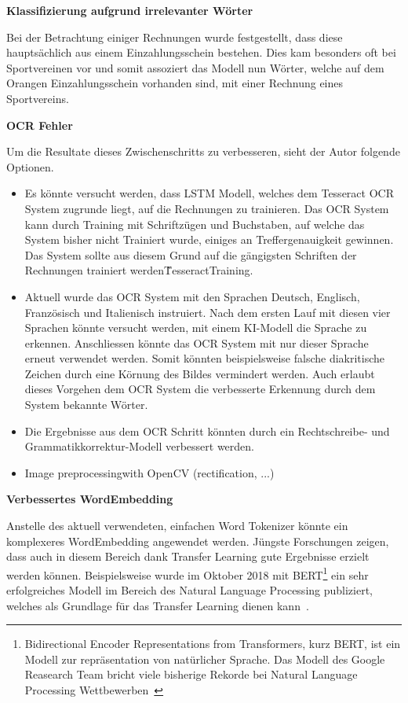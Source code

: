 \textbf{Klassifizierung aufgrund irrelevanter Wörter}

Bei der Betrachtung einiger Rechnungen wurde festgestellt, dass diese hauptsächlich aus einem Einzahlungsschein bestehen. Dies kam besonders oft bei Sportvereinen vor und somit assoziert das Modell nun Wörter, welche auf dem Orangen Einzahlungsschein vorhanden sind, mit einer Rechnung eines Sportvereins.

\hspace{10cm}


\hspace{10cm}

\textbf{OCR Fehler}

Um die Resultate dieses Zwischenschritts zu verbesseren, sieht der Autor folgende Optionen.

\begin{itemize}
    \item Es könnte versucht werden, dass LSTM Modell, welches dem Tesseract OCR System zugrunde liegt, auf die Rechnungen zu trainieren. Das OCR System kann durch Training mit Schriftzügen und Buchstaben, auf welche das System bisher nicht Trainiert wurde, einiges an Treffergenauigkeit gewinnen. Das System sollte aus diesem Grund auf die gängigsten Schriften der Rechnungen trainiert werden\~{TesseractTraining}.
    \item Aktuell wurde das OCR System mit den Sprachen Deutsch, Englisch, Französisch und Italienisch instruiert. Nach dem ersten Lauf mit diesen vier Sprachen könnte versucht werden, mit einem KI-Modell die Sprache zu erkennen. Anschliessen könnte das OCR System mit nur dieser Sprache erneut verwendet werden. Somit könnten beispielsweise falsche diakritische Zeichen durch eine Körnung des Bildes vermindert werden. Auch erlaubt dieses Vorgehen dem OCR System die verbesserte Erkennung durch dem System bekannte Wörter.
    \item Die Ergebnisse aus dem OCR Schritt könnten durch ein Rechtschreibe- und Grammatikkorrektur-Modell verbessert werden. 
    \item Image preprocessingwith OpenCV (rectification, ...)
\end{itemize}

\textbf{Verbessertes WordEmbedding}

Anstelle des aktuell verwendeten, einfachen Word Tokenizer könnte ein komplexeres WordEmbedding angewendet werden. Jüngste Forschungen zeigen, dass auch in diesem Bereich dank Transfer Learning gute Ergebnisse erzielt werden können. Beispielsweise wurde im Oktober 2018 mit BERT\footnote{Bidirectional Encoder Representations from Transformers, kurz BERT, ist ein Modell zur repräsentation von natürlicher Sprache. Das Modell des Google Reasearch Team bricht viele bisherige Rekorde bei Natural Language Processing Wettbewerben~\autocite{Devlin2018}} ein sehr erfolgreiches Modell im Bereich des Natural Language Processing publiziert, welches als Grundlage für das Transfer Learning dienen kann~\autocite{Devlin2018}.


